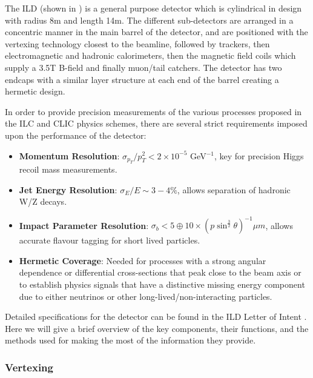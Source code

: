 The ILD (shown in ) is a general purpose detector which is cylindrical in design with radius 8m and length 14m. The different sub-detectors are arranged in a concentric manner in the main barrel of the detector, and are positioned with the vertexing technology closest to the beamline, followed by trackers, then electromagnetic and hadronic calorimeters, then the magnetic field coils which supply a 3.5T B-field and finally muon/tail catchers. The detector has two endcaps with a similar layer structure at each end of the barrel creating a hermetic design.

In order to provide precision measurements of the various processes proposed in the \ac{ILC} and \ac{CLIC} physics schemes, there are several strict requirements imposed upon the performance of the detector:

\begin{itemize}

\item \textbf{Momentum Resolution}: $\sigma_{p_T}/ p_{T}^2 < 2 \times 10^{-5}$ GeV$^{-1}$, key for precision Higgs recoil mass measurements.

\item \textbf{Jet Energy Resolution}: $\sigma_E/E \sim 3-4\%$, allows separation of hadronic W/Z decays.

\item \textbf{Impact Parameter Resolution}: $\sigma_{b} < 5 \oplus 10 \times (p\sin^{\frac{3}{2}}\theta)^{-1}\mu m$, allows accurate flavour tagging for short lived particles.

\item \textbf{Hermetic Coverage}: Needed for processes with a strong angular dependence or differential cross-sections that peak close to the beam axis or to establish physics signals that have a distinctive missing energy component due to either neutrinos or other long-lived/non-interacting particles.

\end{itemize}

Detailed specifications for the detector can be found in the \ac{ILD} Letter of Intent \cite{ILD}. Here we will give a brief overview of the key components, their functions, and the methods used for making the most of the information they provide.

\subsubsection{Vertexing}

